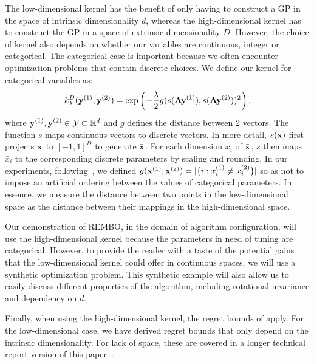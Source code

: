 \documentclass{article}
\begin{document}
The low-dimensional kernel has the benefit of only having to construct a GP in the space of intrinsic dimensionality $d$, whereas the high-dimensional kernel has to construct the GP in a space of extrinsic dimensionality $D$. However,
the choice of kernel also depends on whether our variables are continuous, integer or categorical. The categorical case is important because we often encounter optimization problems that contain discrete choices.
We define our kernel for categorical variables as:
$$k^D_{\lambda}(\mathbf{y}^{(1)}, \mathbf{y}^{(2)}) = \exp\left(-\frac{\lambda}{2} g(s(\mathbf{A}\mathbf{y}^{(1)}), s(\mathbf{A}\mathbf{y}^{(2)}))^2\right),$$
where $\mathbf{y}^{(1)}, \mathbf{y}^{(2)} \in {\cal Y} \subset \mathbb{R}^d$ and $g$ defines the distance between 2 vectors. The function $s$ maps continuous vectors to discrete vectors. In more detail, $s(\mathbf{x})$ first projects $\mathbf{x}$ to $[-1,1]^D$ to generate $\bar{\mathbf{x}}$. For each dimension $\bar{x}_i$ of $\bar{\mathbf{x}}$, $s$ then maps $\bar{x}_i$ to the corresponding discrete parameters by scaling and rounding. In our experiments, following~\cite{Hutter:2009}, we defined $g(\mathbf{x}^{(1)}, \mathbf{x}^{(2)}) = |\{i: x^{(1)}_i \neq x^{(2)}_i\}|$ 
so as not to impose an artificial ordering between the values of categorical parameters. 
In essence, we measure the distance between two points in the low-dimensional space as the distance between their mappings in the high-dimensional space. 

Our demonstration of REMBO, in the domain of algorithm configuration, will use the high-dimensional kernel because the parameters in need of tuning are categorical. However, to provide the reader with a taste of the potential gains that the low-dimensional kernel could offer in continuous spaces, we will use a synthetic optimization problem. This synthetic example will also allow us to easily discuss different properties of the algorithm, including rotational invariance and dependency on $d$.

Finally, when using the high-dimensional kernel, the regret bounds of \cite{Srinivas:2010,Bull:2011,deFreitas:2012} apply. For the low-dimensional case, we have derived regret bounds that only depend on the intrinsic dimensionality. For lack of space, these are covered in a longer technical report version of this paper~\cite{WanEtAl13:REMBO_arXiv}.
\end{document}
